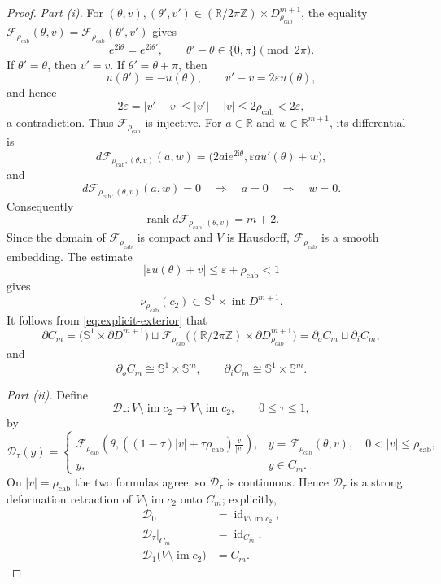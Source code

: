 \documentclass[10pt,a4paper]{amsart}
\newcommand{\rhoCab}{{\rho_{\mathrm{cab}}}}
\begin{document}
\begin{proof}
\emph{Part \textup{(i)}.}
For $(\theta,v),(\theta',v')\in
(\mathbb R/2\pi\mathbb Z)\times D^{m+1}_{\rhoCab}$, the equality
$\mathcal F_{\rhoCab}(\theta,v)
 =\mathcal F_{\rhoCab}(\theta',v')$ gives
\[
 e^{2\mathrm i\theta}=e^{2\mathrm i\theta'},
 \qquad
 \theta'-\theta\in\{0,\pi\}\pmod{2\pi}.
\]
If $\theta'=\theta$, then $v'=v$.  If
$\theta'=\theta+\pi$, then
\[
 u(\theta')=-u(\theta),
 \qquad
 v'-v=2\varepsilon u(\theta),
\]
and hence
\[
 2\varepsilon=|v'-v|\le |v'|+|v|\le2\rhoCab<2\varepsilon,
\]
a contradiction.  Thus $\mathcal F_{\rhoCab}$ is injective.  For
$a\in\mathbb R$ and $w\in\mathbb R^{m+1}$, its differential is
\[
 d\mathcal F_{\rhoCab,(\theta,v)}(a,w)
 =\bigl(2a\mathrm i e^{2\mathrm i\theta},
         \varepsilon a u'(\theta)+w\bigr),
\]
and
\[
 d\mathcal F_{\rhoCab,(\theta,v)}(a,w)=0
 \quad\Longrightarrow\quad a=0\quad\Longrightarrow\quad w=0.
\]
Consequently
\[
 \operatorname{rank}d\mathcal F_{\rhoCab,(\theta,v)}=m+2.
\]
Since the domain of $\mathcal F_{\rhoCab}$ is compact and $V$ is Hausdorff,
$\mathcal F_{\rhoCab}$ is a smooth embedding.  The estimate
\[
 |\varepsilon u(\theta)+v|\le\varepsilon+\rhoCab<1
\]
gives
\[
 \nu_{\rhoCab}(c_2)\subset\mathbb S^1\times\operatorname{int}D^{m+1}.
\]
It follows from \eqref{eq:explicit-exterior} that
\[
 \partial C_m
 =\bigl(\mathbb S^1\times\partial D^{m+1}\bigr)
  \sqcup
  \mathcal F_{\rhoCab}
  \bigl((\mathbb R/2\pi\mathbb Z)\times
                         \partial D^{m+1}_{\rhoCab}\bigr)
 =\partial_oC_m\sqcup\partial_iC_m,
\]
and
\[
 \partial_oC_m\cong\mathbb S^1\times\mathbb S^m,
 \qquad
 \partial_iC_m\cong\mathbb S^1\times\mathbb S^m.
\]

\emph{Part \textup{(ii)}.}
Define
\[
\mathcal D_\tau:V\setminus\operatorname{im}c_2\longrightarrow
                  V\setminus\operatorname{im}c_2,
 \qquad 0\le\tau\le1,
\]
by
\[
\mathcal D_\tau(y)=
 \begin{cases}
 \displaystyle
 \mathcal F_{\rhoCab}\left(\theta,
  \left((1-\tau)|v|+\tau\rhoCab\right)\frac{v}{|v|}\right),
 &y=\mathcal F_{\rhoCab}(\theta,v),\quad0<|v|\le\rhoCab,\\[3mm]
 y,&y\in C_m.
 \end{cases}
\]
On $|v|=\rhoCab$ the two formulas agree, so $\mathcal D_\tau$ is
continuous.  Hence $\mathcal D_\tau$ is a strong deformation retraction
of $V\setminus\operatorname{im}c_2$ onto $C_m$; explicitly,
\begin{align*}
 \mathcal D_0&=\operatorname{id}_{V\setminus\operatorname{im}c_2},\\
 \mathcal D_\tau|_{C_m}&=\operatorname{id}_{C_m},\\
 \mathcal D_1\bigl(V\setminus\operatorname{im}c_2\bigr)&=C_m.
\end{align*}


\end{proof}
\end{document}
